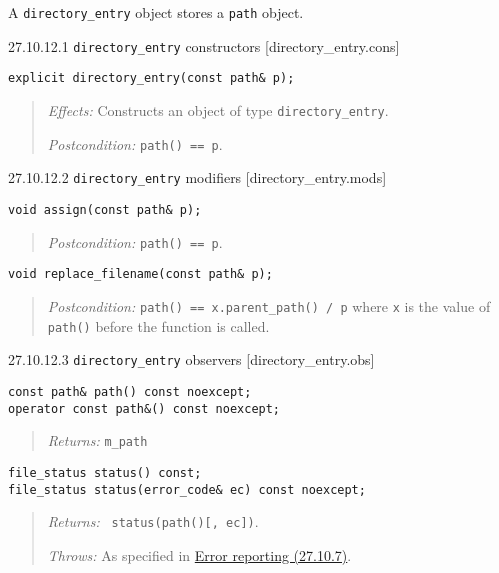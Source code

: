 A \texttt{directory\_entry} object stores a \texttt{path} object.

27.10.12.1 \texttt{directory\_entry} constructors
{[}directory\_entry.cons{]}

\begin{verbatim}
explicit directory_entry(const path& p);
\end{verbatim}

\begin{quote}
\emph{Effects:} Constructs an object of type \texttt{directory\_entry}.

\emph{Postcondition:} \texttt{path()\ ==\ p}.
\end{quote}

27.10.12.2 \texttt{directory\_entry} modifiers
{[}directory\_entry.mods{]}

\begin{verbatim}
void assign(const path& p);
\end{verbatim}

\begin{quote}
\emph{Postcondition:} \texttt{path()\ ==\ p}.
\end{quote}

\begin{verbatim}
void replace_filename(const path& p);
\end{verbatim}

\begin{quote}
\emph{Postcondition:} \texttt{path()\ ==\ x.parent\_path()\ /\ p} where
\texttt{x} is the value of \texttt{path()} before the function is
called.
\end{quote}

27.10.12.3 \texttt{directory\_entry} observers
{[}directory\_entry.obs{]}

\begin{verbatim}
const path& path() const noexcept;
operator const path&() const noexcept;
\end{verbatim}

\begin{quote}
\emph{Returns:} \texttt{m\_path}
\end{quote}

\begin{verbatim}
file_status status() const;
file_status status(error_code& ec) const noexcept;
\end{verbatim}

\begin{quote}
\emph{Returns:} \texttt{\ status(path(){[},\ ec{]})}.

\emph{Throws:} As specified in \hyperref[Error-reporting]{Error
reporting (27.10.7)}.
\end{quote}

